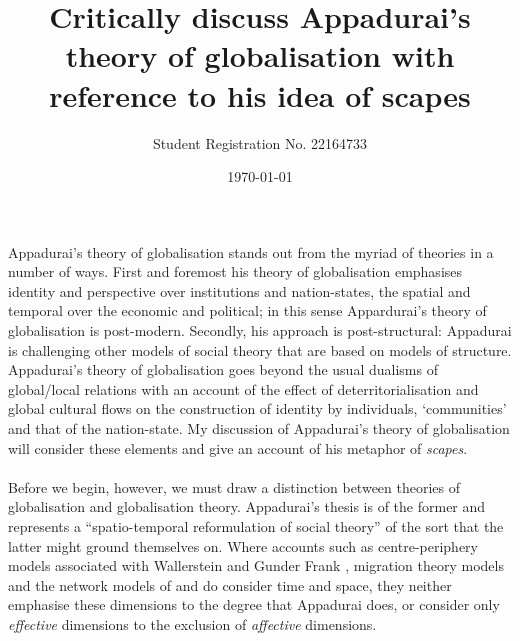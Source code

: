 \documentclass{article}
\title{Critically discuss Appadurai's theory of globalisation with reference to his idea of scapes}
\author{Student Registration No. 22164733}
\date{\today}
\begin{document}
\begin{doublespacing}

\maketitle

\paragraph{}Appadurai's theory of globalisation stands out from the myriad of theories in a number of ways. First and foremost his theory of globalisation emphasises identity and perspective over institutions and nation-states, the spatial and temporal over the economic and political; in this sense Appardurai's theory of globalisation is post-modern. Secondly, his approach is post-structural: Appadurai is challenging other models of social theory that are based on models of structure. Appadurai's theory of globalisation goes beyond the usual dualisms of global/local relations with an account of the effect of deterritorialisation and global cultural flows on the construction of identity by individuals, `communities' and that of the nation-state. My discussion of Appadurai's theory of globalisation will consider these elements and give an account of his metaphor of \emph{scapes}.

\paragraph{}Before we begin, however, we must draw a distinction between theories of globalisation and globalisation theory. Appadurai's thesis is of the former and represents a ``spatio-temporal reformulation of social theory'' \cite[p.4] {Rosenberg:2000fg} of the sort that the latter might ground themselves on. Where accounts such as centre-periphery models associated with Wallerstein \cite{Wallerstein:1979cw,worsley:1990ow} and Gunder Frank \cite{Frank:1975du}, migration theory models and the network models of   and  do consider time and space, they neither emphasise these dimensions to the degree that Appadurai does, or consider only \emph{effective} dimensions to the exclusion of \emph{affective} dimensions.


\end{doublespacing}
\end{document}
